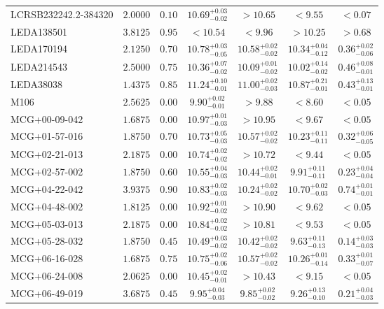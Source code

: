 \documentclass[onecolumn]{mn2e}
\begin{document}
{\begin{center}
\begin{longtable}{lcccccc}
LCRSB232242.2-384320 & $2.0000$ & $0.10$ & $10.69_{-0.02}^{+0.03}$ & $>10.65$ & $<9.55$ &$<0.07$ \\
LEDA138501 & $3.8125$ & $0.95$ & $<10.54$ & $<9.96$ & $>10.25$ &$>0.68$ \\
LEDA170194 & $2.1250$ & $0.70$ & $10.78_{-0.05}^{+0.03}$ & $10.58_{-0.02}^{+0.02}$ & $10.34_{-0.12}^{+0.04}$ &$0.36_{-0.06}^{+0.02}$ \\
LEDA214543 & $2.5000$ & $0.75$ & $10.36_{-0.02}^{+0.07}$ & $10.09_{-0.02}^{+0.01}$ & $10.02_{-0.02}^{+0.14}$ &$0.46_{-0.01}^{+0.08}$ \\
LEDA38038 & $1.4375$ & $0.85$ & $11.24_{-0.01}^{+0.10}$ & $11.00_{-0.03}^{+0.02}$ & $10.87_{-0.01}^{+0.21}$ &$0.43_{-0.01}^{+0.13}$ \\
M106 & $2.5625$ & $0.00$ & $9.90_{-0.01}^{+0.02}$ & $>9.88$ & $<8.60$ &$<0.05$ \\
MCG+00-09-042 & $1.6875$ & $0.00$ & $10.97_{-0.03}^{+0.01}$ & $>10.95$ & $<9.67$ &$<0.05$ \\
MCG+01-57-016 & $1.8750$ & $0.70$ & $10.73_{-0.03}^{+0.05}$ & $10.57_{-0.02}^{+0.02}$ & $10.23_{-0.11}^{+0.11}$ &$0.32_{-0.05}^{+0.06}$ \\
MCG+02-21-013 & $2.1875$ & $0.00$ & $10.74_{-0.02}^{+0.02}$ & $>10.72$ & $<9.44$ &$<0.05$ \\
MCG+02-57-002 & $1.8750$ & $0.60$ & $10.55_{-0.03}^{+0.04}$ & $10.44_{-0.01}^{+0.02}$ & $9.91_{-0.11}^{+0.11}$ &$0.23_{-0.04}^{+0.04}$ \\
MCG+04-22-042 & $3.9375$ & $0.90$ & $10.83_{-0.03}^{+0.02}$ & $10.24_{-0.02}^{+0.02}$ & $10.70_{-0.03}^{+0.02}$ &$0.74_{-0.01}^{+0.01}$ \\
MCG+04-48-002 & $1.8125$ & $0.00$ & $10.92_{-0.02}^{+0.01}$ & $>10.90$ & $<9.62$ &$<0.05$ \\
MCG+05-03-013 & $2.1875$ & $0.00$ & $10.84_{-0.02}^{+0.02}$ & $>10.81$ & $<9.53$ &$<0.05$ \\
MCG+05-28-032 & $1.8750$ & $0.45$ & $10.49_{-0.02}^{+0.03}$ & $10.42_{-0.02}^{+0.02}$ & $9.63_{-0.13}^{+0.11}$ &$0.14_{-0.03}^{+0.03}$ \\
MCG+06-16-028 & $1.6875$ & $0.75$ & $10.75_{-0.06}^{+0.02}$ & $10.57_{-0.02}^{+0.02}$ & $10.26_{-0.14}^{+0.01}$ &$0.33_{-0.07}^{+0.01}$ \\
MCG+06-24-008 & $2.0625$ & $0.00$ & $10.45_{-0.01}^{+0.02}$ & $>10.43$ & $<9.15$ &$<0.05$ \\
MCG+06-49-019 & $3.6875$ & $0.45$ & $9.95_{-0.03}^{+0.04}$ & $9.85_{-0.02}^{+0.02}$ & $9.26_{-0.10}^{+0.13}$ &$0.21_{-0.03}^{+0.04}$ \\

\end{longtable}
\end{center}}
\end{document}

